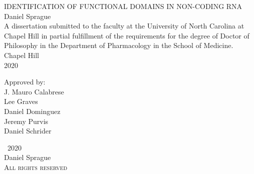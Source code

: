 \documentclass[11pt]{report}
\def\frontmatter{%
    \pagenumbering{roman}
    \setcounter{page}{1}
    \renewcommand{\thesection}{\Roman{section}}
}%
\begin{document}
\begin{titlepage}
   \begin{singlespacing}
   \begin{center}
       \vspace*{1in}
       IDENTIFICATION OF FUNCTIONAL DOMAINS IN NON-CODING RNA\\
       \vspace{1in}
       Daniel Sprague\\
       \vspace{1in}
       A dissertation submitted to the faculty at the University of North Carolina at Chapel Hill in partial fulfillment of the requirements for the degree of Doctor of Philosophy in the Department of Pharmacology in the School of Medicine.\\
       \vspace{1in}
       Chapel Hill\\
       2020
    \end{center}
    \end{singlespacing}
    \vspace{1in}
    \begin{flushleft}
    \hspace{3.6in} Approved by:\\
     \hspace{3.6in}  J. Mauro Calabrese\\
     \hspace{3.6in}   Lee Graves\\
      \hspace{3.6in}  Daniel Dominguez\\
      \hspace{3.6in}  Jeremy Purvis\\
      \hspace{3.6in}   Daniel Schrider
      \end{flushleft}
\end{titlepage}
\frontmatter

\clearpage 
\thispagestyle{plain}
\begin{center}
    \null 
    \vfill
    \begin{singlespacing}
    \textcopyright \ 2020\\
    Daniel Sprague\\
    \textsc{All rights reserved}
    \end{singlespacing}
\end{center}

\renewcommand\abstractname{\normalfont\textsc{Abstract}}
\end{document}

